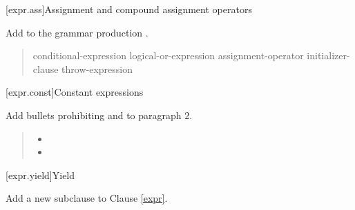 \setcounter{section}{16}
[expr.ass]{Assignment and compound assignment operators}%

Add  to the grammar production .

\begin{quote}
\begin{bnf}
  \br
  conditional-expression\br
  logical-or-expression assignment-operator initializer-clause\br
  throw-expression \br
\end{bnf}
\end{quote}

\setcounter{section}{18}
[expr.const]{Constant expressions}%

Add bullets prohibiting  and  to paragraph 2.

\begin{quote}
\begin{itemize}
	\item 
	\item 
\end{itemize}
\end{quote}

\setcounter{section}{19}
[expr.yield]{Yield}%

Add a new subclause to Clause \ref{expr}.

